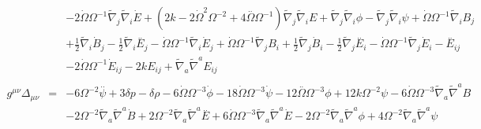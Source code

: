 \documentclass[10pt,letterpaper]{article}
\numberwithin{equation}{section}
\begin{document}
\begin{eqnarray}
&& - 2 \dot{\Omega} \Omega^{-1} \tilde{\nabla}_{j}\tilde{\nabla}_{i}\dot{E} + (2 k - 2 \dot{\Omega}^2 \Omega^{-2} + 4 \overset{..}{\Omega} \Omega^{-1}) \tilde{\nabla}_{j}\tilde{\nabla}_{i}E + \tilde{\nabla}_{j}\tilde{\nabla}_{i}\phi -  \tilde{\nabla}_{j}\tilde{\nabla}_{i}\psi +\dot{\Omega} \Omega^{-1} \tilde{\nabla}_{i}B_{j} \nonumber \\ 
&& + \tfrac{1}{2} \tilde{\nabla}_{i}\dot{B}_{j} -  \tfrac{1}{2} \tilde{\nabla}_{i}\overset{..}{E}_{j} -  \dot{\Omega} \Omega^{-1} \tilde{\nabla}_{i}\dot{E}_{j} + \dot{\Omega} \Omega^{-1} \tilde{\nabla}_{j}B_{i} + \tfrac{1}{2} \tilde{\nabla}_{j}\dot{B}_{i} -  \tfrac{1}{2} \tilde{\nabla}_{j}\overset{..}{E}_{i} -  \dot{\Omega} \Omega^{-1} \tilde{\nabla}_{j}\dot{E}_{i}- \overset{..}{E}_{ij} \nonumber \\ 
&& - 2 \dot{\Omega} \Omega^{-1} \dot{E}_{ij} - 2 k E_{ij} + \tilde{\nabla}_{a}\tilde{\nabla}^{a}E_{ij}
\\  \nonumber\\ 
g^{\mu\nu}\Delta_{\mu\nu}&=& -6 \Omega^{-2} \overset{..}{\psi} + 3 \delta p -  \delta \rho - 6 \dot{\Omega} \Omega^{-3} \dot{\phi} - 18 \dot{\Omega} \Omega^{-3} \dot{\psi} - 12 \overset{..}{\Omega} \Omega^{-3} \phi + 12 k \Omega^{-2} \psi - 6 \dot{\Omega} \Omega^{-3} \tilde{\nabla}_{a}\tilde{\nabla}^{a}B \nonumber \\ 
&& - 2 \Omega^{-2} \tilde{\nabla}_{a}\tilde{\nabla}^{a}\dot{B} + 2 \Omega^{-2} \tilde{\nabla}_{a}\tilde{\nabla}^{a}\overset{..}{E} + 6 \dot{\Omega} \Omega^{-3} \tilde{\nabla}_{a}\tilde{\nabla}^{a}\dot{E} - 2 \Omega^{-2} \tilde{\nabla}_{a}\tilde{\nabla}^{a}\phi + 4 \Omega^{-2} \tilde{\nabla}_{a}\tilde{\nabla}^{a}\psi 
\end{eqnarray}
%
%
\end{document}
